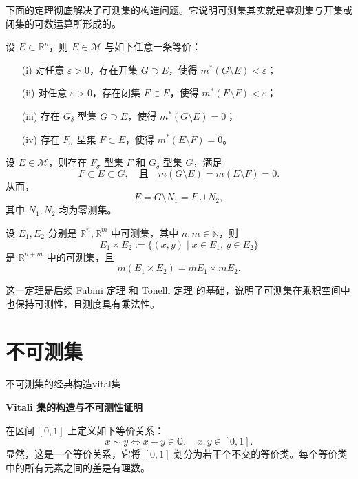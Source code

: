 \documentclass[lang=cn,10pt]{elegantbook}
\begin{document}
下面的定理彻底解决了可测集的构造问题。它说明可测集其实就是零测集与开集或闭集的可数运算所形成的。

\begin{corollary}
设 $E \subset \mathbb{R}^n$，则 $E \in \mathcal{M}$ 与如下任意一条等价：
\begin{itemize}
  \item[(i)] 对任意 $\varepsilon > 0$，存在开集 $G \supset E$，使得 $m^*(G \setminus E) < \varepsilon$；
  \item[(ii)] 对任意 $\varepsilon > 0$，存在闭集 $F \subset E$，使得 $m^*(E \setminus F) < \varepsilon$；
  \item[(iii)] 存在 $G_\delta$ 型集 $G \supset E$，使得 $m^*(G \setminus E) = 0$；
  \item[(iv)] 存在 $F_\sigma$ 型集 $F \subset E$，使得 $m^*(E \setminus F) = 0$。
\end{itemize}
\end{corollary}
\begin{theorem}[可测集的构造]
设 $E \in \mathcal{M}$，则存在 $F_\sigma$ 型集 $F$ 和 $G_\delta$ 型集 $G$，满足
\[
F \subset E \subset G, \quad \text{且} \quad m(G \setminus E) = m(E \setminus F) = 0.
\]
从而，
\[
E = G \setminus N_1 = F \cup N_2,
\]
其中 $N_1, N_2$ 均为零测集。
\end{theorem}

\begin{theorem}[乘积集合的可测性]
设 $E_1, E_2$ 分别是 $\mathbb{R}^n, \mathbb{R}^m$ 中可测集，其中 $n, m \in \mathbb{N}$，则
\[
E_1 \times E_2 := \{(x, y) \mid x \in E_1,\, y \in E_2\}
\]
是 $\mathbb{R}^{n+m}$ 中的可测集，且
\[
m(E_1 \times E_2) = mE_1 \times mE_2.
\]
\end{theorem}
这一定理是后续 Fubini 定理 和 Tonelli 定理 的基础，说明了可测集在乘积空间中也保持可测性，且测度具有乘法性。






\section{不可测集}
\begin{definition}[不可测集]
    不可测集的经典构造vital集
\end{definition}
\textbf{Vitali 集的构造与不可测性证明}

在区间 $[0,1]$ 上定义如下等价关系：
\[
x \sim y \iff x - y \in \mathbb{Q}, \quad x,y \in [0,1].
\]
显然，这是一个等价关系，它将 $[0,1]$ 划分为若干个不交的等价类。每个等价类中的所有元素之间的差是有理数。
\end{document}
